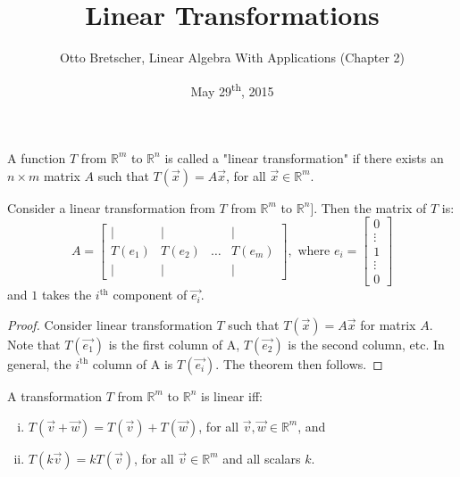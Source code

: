 \documentclass[a4paper,11pt]{article}
\title{Linear Transformations}
\author{Otto Bretscher, Linear Algebra With Applications (Chapter 2)}
\date{May 29\textsuperscript{th}, 2015}
\begin{document}
\maketitle
{}

\begin{outline}

    A function \(T\) from \(\mathbb{R}^m\) to \(\mathbb{R}^n\) is called a "linear transformation" if there exists 
    an \(n \times m\) matrix \(A\) such that \(T(\vec{x}) = A\vec{x}\), for all \(\vec{x} \in \mathbb{R}^m\).
    
    Consider a linear transformation from \(T\) from \(\mathbb{R}^m\) to \(\mathbb{R}^n]\). Then the matrix of \(T\) is:
    \[
      A = 
        \begin{bmatrix} 
          \vert  & \vert  &        & \vert  \\
          T(e_1) & T(e_2) & \ldots & T(e_m) \\
          \vert  & \vert  &        & \vert
        \end{bmatrix}
      ,\text{ where } e_{i} = \begin{bmatrix} 0 \\ \vdots \\ 1 \\ \vdots \\ 0 \end{bmatrix}
    \]
    and \(1\) takes the \(i^{\text{th}}\) component of \(\vec{e_i}\).
    
    \begin{proof}
      Consider linear transformation \(T\) such that \(T(\vec{x}) = A\vec{x}\) for matrix \(A\). Note that
      \(T(\vec{e_1})\) is the first column of A, \(T(\vec{e_2})\) is the second column, etc. In general, the
      \(i^{\text{th}}\) column of A is \(T(\vec{e_i})\). The theorem then follows.
    \end{proof}
    
    A transformation \(T\) from \(\mathbb{R}^m\) to \(\mathbb{R}^n\) is linear iff:
    \begin{enumerate}[i.]
      \item \(T(\vec{v} + \vec{w}) = T(\vec{v}) + T(\vec{w})\), for all \(\vec{v}, \vec{w} \in \mathbb{R}^m\), and
      \item \(T(k\vec{v}) = kT(\vec{v})\), for all \(\vec{v} \in \mathbb{R}^m\) and all scalars \(k\).
    \end{enumerate}
    

\end{outline}
\end{document}
